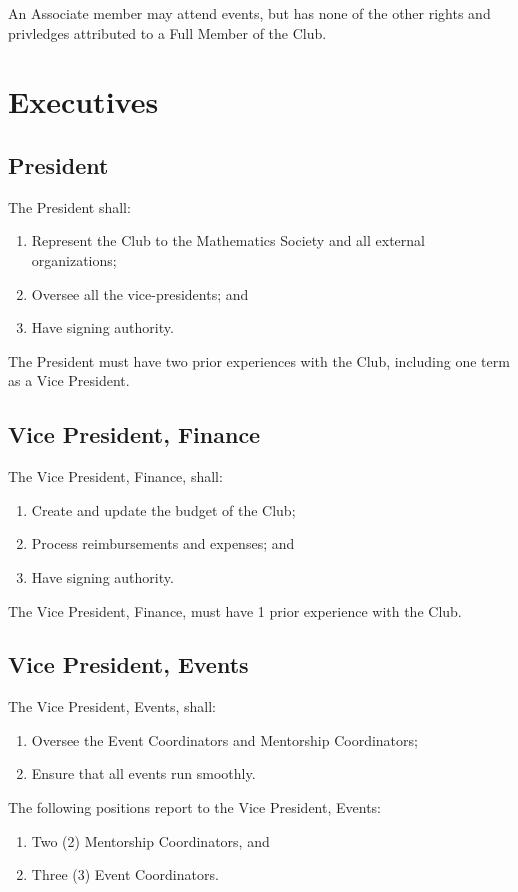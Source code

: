 \documentclass[11pt]{mathsoc}
\begin{document}
An Associate member may attend events, but has none of the other rights
and privledges attributed to a Full Member of the Club.

\section{Executives}

\subsection{President}
The President shall:
\begin{enumerate}
    \item Represent the Club to the Mathematics Society and all external 
        organizations; 
    \item Oversee all the vice-presidents; and
    \item Have signing authority.
\end{enumerate}
    
The President must have two prior experiences with the Club, including one term 
as a Vice President.

\subsection{Vice President, Finance}
The Vice President, Finance, shall:
\begin{enumerate}
    \item Create and update the budget of the Club;
    \item Process reimbursements and expenses; and
    \item Have signing authority. 
\end{enumerate}

The Vice President, Finance, must have 1 prior experience with the Club.

\subsection{Vice President, Events}
The Vice President, Events, shall:
\begin{enumerate}
    \item Oversee the Event Coordinators and Mentorship Coordinators; 
    \item Ensure that all events run smoothly. 
\end{enumerate}

The following positions report to the Vice President, Events:
\begin{enumerate}
    \item Two (2) Mentorship Coordinators, and
    \item Three (3) Event Coordinators.
\end{enumerate}
\end{document}
